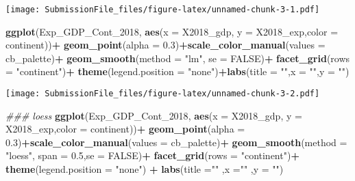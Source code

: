 \documentclass[]{article}
\newenvironment{Shaded}{\begin{snugshade}}{\end{snugshade}}
\newcommand{\CommentTok}[1]{\textcolor[rgb]{0.56,0.35,0.01}{\textit{#1}}}
\newcommand{\DataTypeTok}[1]{\textcolor[rgb]{0.13,0.29,0.53}{#1}}
\newcommand{\DecValTok}[1]{\textcolor[rgb]{0.00,0.00,0.81}{#1}}
\newcommand{\FloatTok}[1]{\textcolor[rgb]{0.00,0.00,0.81}{#1}}
\newcommand{\KeywordTok}[1]{\textcolor[rgb]{0.13,0.29,0.53}{\textbf{#1}}}
\newcommand{\NormalTok}[1]{#1}
\newcommand{\OperatorTok}[1]{\textcolor[rgb]{0.81,0.36,0.00}{\textbf{#1}}}
\newcommand{\OtherTok}[1]{\textcolor[rgb]{0.56,0.35,0.01}{#1}}
\newcommand{\StringTok}[1]{\textcolor[rgb]{0.31,0.60,0.02}{#1}}
\begin{document}
\texttt{[image: SubmissionFile\_files/figure-latex/unnamed-chunk-3-1.pdf]}

\begin{Shaded}
\begin{Highlighting}[]
\KeywordTok{ggplot}\NormalTok{(Exp_GDP_Cont_}\DecValTok{2018}\NormalTok{, }\KeywordTok{aes}\NormalTok{(}\DataTypeTok{x =}\NormalTok{ X2018_gdp, }\DataTypeTok{y =}\NormalTok{ X2018_exp,}\DataTypeTok{color =}\NormalTok{ continent))}\OperatorTok{+}\StringTok{ }
\StringTok{  }
\StringTok{  }\KeywordTok{geom_point}\NormalTok{(}\DataTypeTok{alpha =} \FloatTok{0.3}\NormalTok{)}\OperatorTok{+}\KeywordTok{scale_color_manual}\NormalTok{(}\DataTypeTok{values =}\NormalTok{ cb_palette)}\OperatorTok{+}
\StringTok{  }\KeywordTok{geom_smooth}\NormalTok{(}\DataTypeTok{method =} \StringTok{"lm"}\NormalTok{, }\DataTypeTok{se =} \OtherTok{FALSE}\NormalTok{)}\OperatorTok{+}\StringTok{ }\KeywordTok{facet_grid}\NormalTok{(}\DataTypeTok{rows =} \StringTok{"continent"}\NormalTok{)}\OperatorTok{+}
\StringTok{  }\KeywordTok{theme}\NormalTok{(}\DataTypeTok{legend.position =} \StringTok{"none"}\NormalTok{)}\OperatorTok{+}\KeywordTok{labs}\NormalTok{(}\DataTypeTok{title =} \StringTok{""}\NormalTok{,}\DataTypeTok{x =} \StringTok{""}\NormalTok{,}\DataTypeTok{y =} \StringTok{""}\NormalTok{)}
\end{Highlighting}
\end{Shaded}

\texttt{[image: SubmissionFile\_files/figure-latex/unnamed-chunk-3-2.pdf]}

\begin{Shaded}
\begin{Highlighting}[]
\CommentTok{### loess}
\KeywordTok{ggplot}\NormalTok{(Exp_GDP_Cont_}\DecValTok{2018}\NormalTok{, }\KeywordTok{aes}\NormalTok{(}\DataTypeTok{x =}\NormalTok{ X2018_gdp, }\DataTypeTok{y =}\NormalTok{ X2018_exp,}\DataTypeTok{color =}\NormalTok{ continent))}\OperatorTok{+}\StringTok{ }
\StringTok{  }
\StringTok{  }\KeywordTok{geom_point}\NormalTok{(}\DataTypeTok{alpha =} \FloatTok{0.3}\NormalTok{)}\OperatorTok{+}\KeywordTok{scale_color_manual}\NormalTok{(}\DataTypeTok{values =}\NormalTok{ cb_palette)}\OperatorTok{+}
\StringTok{  }\KeywordTok{geom_smooth}\NormalTok{(}\DataTypeTok{method =} \StringTok{"loess"}\NormalTok{, }\DataTypeTok{span =} \FloatTok{0.5}\NormalTok{,}\DataTypeTok{se =} \OtherTok{FALSE}\NormalTok{)}\OperatorTok{+}\StringTok{ }\KeywordTok{facet_grid}\NormalTok{(}\DataTypeTok{rows =} \StringTok{"continent"}\NormalTok{)}\OperatorTok{+}
\StringTok{  }\KeywordTok{theme}\NormalTok{(}\DataTypeTok{legend.position =} \StringTok{"none"}\NormalTok{) }\OperatorTok{+}\StringTok{ }\KeywordTok{labs}\NormalTok{(}\DataTypeTok{title =}\StringTok{""}\NormalTok{ ,}\DataTypeTok{x =}\StringTok{""}\NormalTok{ ,}\DataTypeTok{y =} \StringTok{""}\NormalTok{)}
\end{Highlighting}
\end{Shaded}
\end{document}
